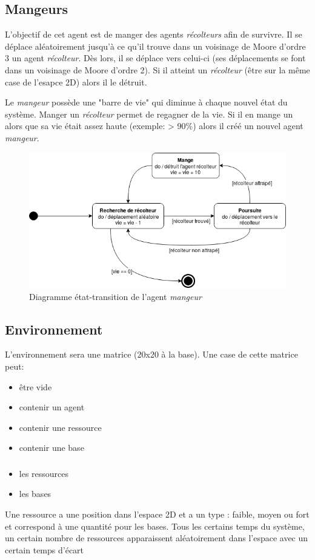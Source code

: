 \documentclass{article}
\begin{document}
\subsection{Mangeurs}
L'objectif de cet agent est de manger des agents \emph{récolteurs} afin de survivre.
Il se déplace aléatoirement jusqu'à ce qu'il trouve dans un voisinage de Moore d'ordre 3
un agent \emph{récolteur}. Dès lors, il se déplace vers celui-ci (ses déplacements se
font dans un voisinage de Moore d'ordre 2). Si il atteint un \emph{récolteur} (être
sur la même case de l'esapce 2D) alors il le détruit.

Le \emph{mangeur} possède une "barre de vie" qui diminue à chaque nouvel état du système.
Manger un \emph{récolteur} permet de regagner de la vie. Si il en mange un alors que sa
vie était assez haute (exemple: > 90\%) alors il créé un nouvel agent \emph{mangeur}.

\begin{figure}[!ht]
  \centering
  \caption{Diagramme état-transition de l'agent \emph{mangeur}}
  \includegraphics[scale=0.75]{img/etat-transition_mangeur.png}
\end{figure}

\subsection{Environnement}
L'environnement sera une matrice (20x20 à la base). Une case de cette matrice peut:
\begin{itemize}
  \item être vide
  \item contenir un agent
  \item contenir une ressource
  \item contenir une base
\end{itemize}

\subsubsection{}
\begin{itemize}
  \item les ressources
  \item les bases
\end{itemize}

Une ressource a une position dans l'espace 2D et a un type : faible, moyen ou fort et
correspond à une quantité pour les bases. Tous les certains temps du système, un certain
nombre de ressources apparaissent aléatoirement dans l'espace avec un certain temps
d'écart
\end{document}
